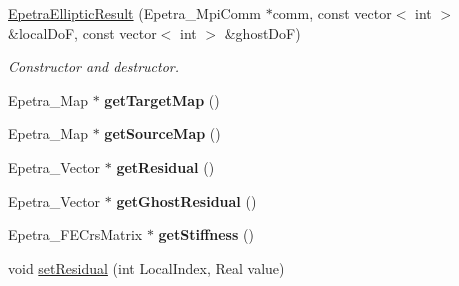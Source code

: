 \begin{DoxyCompactItemize}
\item 
\hypertarget{structvoom_1_1_epetra_elliptic_result_ac45f33256ef64dbe74fdb01a1271a6ac}{
\hyperlink{structvoom_1_1_epetra_elliptic_result_ac45f33256ef64dbe74fdb01a1271a6ac}{EpetraEllipticResult} (Epetra\_\-MpiComm $\ast$comm, const vector$<$ int $>$ \&localDoF, const vector$<$ int $>$ \&ghostDoF)}
\label{structvoom_1_1_epetra_elliptic_result_ac45f33256ef64dbe74fdb01a1271a6ac}

\begin{DoxyCompactList}\small\item\em Constructor and destructor. \item\end{DoxyCompactList}\item 
\hypertarget{structvoom_1_1_epetra_elliptic_result_ae68a71fb2424988264c87affb2476e66}{
Epetra\_\-Map $\ast$ {\bfseries getTargetMap} ()}
\label{structvoom_1_1_epetra_elliptic_result_ae68a71fb2424988264c87affb2476e66}

\item 
\hypertarget{structvoom_1_1_epetra_elliptic_result_ac2bf38c0ab13d2eb74504b0652bf718c}{
Epetra\_\-Map $\ast$ {\bfseries getSourceMap} ()}
\label{structvoom_1_1_epetra_elliptic_result_ac2bf38c0ab13d2eb74504b0652bf718c}

\item 
\hypertarget{structvoom_1_1_epetra_elliptic_result_afbe6bca2346c34d65a928069e1be922e}{
Epetra\_\-Vector $\ast$ {\bfseries getResidual} ()}
\label{structvoom_1_1_epetra_elliptic_result_afbe6bca2346c34d65a928069e1be922e}

\item 
\hypertarget{structvoom_1_1_epetra_elliptic_result_a3079d8ae6e2a86e64fbfc9c1809faf3d}{
Epetra\_\-Vector $\ast$ {\bfseries getGhostResidual} ()}
\label{structvoom_1_1_epetra_elliptic_result_a3079d8ae6e2a86e64fbfc9c1809faf3d}

\item 
\hypertarget{structvoom_1_1_epetra_elliptic_result_af78dd81f6d8c2ae243e1e7ef03459d6d}{
Epetra\_\-FECrsMatrix $\ast$ {\bfseries getStiffness} ()}
\label{structvoom_1_1_epetra_elliptic_result_af78dd81f6d8c2ae243e1e7ef03459d6d}

\item 
\hypertarget{structvoom_1_1_epetra_elliptic_result_ae1bc6da535080844bb4d6e437c7b6a87}{
void \hyperlink{structvoom_1_1_epetra_elliptic_result_ae1bc6da535080844bb4d6e437c7b6a87}{setResidual} (int LocalIndex, Real value)}
\label{structvoom_1_1_epetra_elliptic_result_ae1bc6da535080844bb4d6e437c7b6a87}


\end{DoxyCompactItemize}

